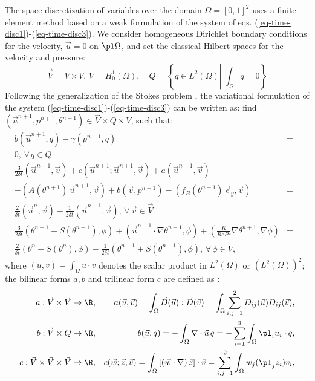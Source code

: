 The space discretization of variables over the domain $\Omega=[0,1]^2$ uses a finite-element method based on a weak formulation of the system of eqs. (\ref{eq-time-disc1})-(\ref{eq-time-disc3}). 
We consider homogeneous Dirichlet boundary conditions for the velocity, \ie $\vec{u}=0$ on $\pl \Omega$, and set the classical Hilbert spaces for the velocity and pressure:
\begin{equation}
\vec{V}=V\times V, \, V=H^1_0(\Omega), \quad Q=\left\{q\in L^2(\Omega)\left|\; \int_{\Omega}q=0\right.\right\}
\end{equation}
Following the generalization of the Stokes problem \citep{Temam,GRaviart,Quarteroni}, the variational formulation of the system  (\ref{eq-time-disc1})-(\ref{eq-time-disc3}) can be written as: find $(\vec{u}^{n+1}, p^{n+1}, \theta^{n+1}) \in \vec{V}\times Q\times V$, such that:
\begin{eqnarray}
\label{eq-weak-all}
b\left(\vec{u}^{n+1}, q\right) - \gamma (p^{n+1},q)&=& \\ \nonumber
0, \, \forall \, q \in Q \\ %
\frac{3}{2 \delta t} \left(\vec{u}^{n+1},\vec{v}\right) + c\left(\vec{u}^{n+1} ; \vec{u}^{n+1}, \vec{v} \right) +
{a\left(\vec{u}^{n+1}, \vec{v}\right)} & &\\ \nonumber
- (A(\theta^{n+1}) \, \vec u^{n+1},\vec v)+ b\left(\vec{v}, p^{n+1}\right)
- {\left(f_B(\theta^{n+1}) \, \vec{e}_y,\vec{v}\right)}
&=& \\ \nonumber
\frac{2}{\delta t} \left(\vec{u}^{n},\vec{v}\right) 
- \frac{1}{2 \delta t} \left(\vec{u}^{n-1},\vec{v}\right), \, \forall \, \vec{v} \in \vec{V}\\ \label{eq-weak-energy}  %
\frac{3}{2 \delta t} \left(\theta^{n+1} + S(\theta^{n+1}), \phi\right)
+\left(\vec{u}^{n+1} \cdot \nabla \theta^{n+1} , \phi
\right) +
\left( \frac{K}{Re Pr} \nabla \theta^{n+1}, \nabla \phi \right) &=& \\  \nonumber
\frac{2}{\delta t} \left( \theta^{n}+S(\theta^n), \phi\right)
- \frac{1}{2 \delta t} \left( \theta^{n-1}+S(\theta^{n-1}), \phi\right),\, \forall \, \phi \in V,
\end{eqnarray}
where {$(u , v)=\int_{\Omega} u\cdot v$} denotes the scalar product in $L^2(\Omega)$ or $\left(L^2(\Omega)\right)^2$; the bilinear forms $a, b$ and trilinear form $c$ are defined as \cite{GRaviart,Quarteroni}:
\begingroup \small{
	\begin{eqnarray*}\nonumber
		a: \vec{V} \times \vec{V} \rightarrow \R, & & {a(\vec{u},\vec{v})= \int_{\Omega}  
			 \vec{D}(\vec{u}) : \vec{D}(\vec{v}) = \int_{\Omega}   \sum_{i,j=1}^2{D}_{ij}(\vec{u}) {D}_{ij}(\vec{v})},\\ 
		b: \vec{V} \times Q \rightarrow \R, & & b(\vec{u},q) = -\int_{\Omega}\nabla \cdot\vec{u}\, q =
		-\sum_{i=1}^2\int_{\Omega}\pl_i u_i\cdot q, \\ \nonumber
		c: \vec{V} \times \vec{V} \times \vec{V} \rightarrow \R, & & c(\vec{w}; \vec{z}, \vec{v})=\int_{\Omega} \left[\left(\vec{w} \cdot \nabla\right) \vec{z}\right] \cdot\vec{v}
		=\sum_{i,j=1}^2\int_{\Omega} w_j (\pl_j z_i) v_i,
		\label{eq-biforms}
	\end{eqnarray*}
}
